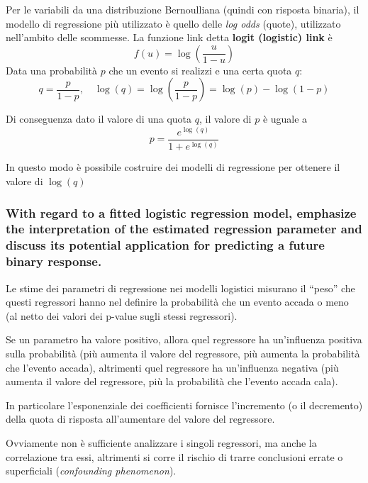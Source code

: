 \documentclass[
]{article}
\begin{document}
Per le variabili da una distribuzione Bernoulliana (quindi con risposta
binaria), il modello di regressione più utilizzato è quello delle
\emph{log odds} (quote), utilizzato nell'ambito delle scommesse. La
funzione link detta \textbf{logit (logistic) link} è
\[ f(u) = \log \left( \frac{u}{1-u}\right) \] Data una probabilità \(p\)
che un evento si realizzi e una certa quota \(q\):
\[q = \frac{p}{1-p}, \quad \log(q) = \log \left( \frac{p}{1-p}\right) = \log(p) - \log(1-p)\]

Di conseguenza dato il valore di una quota \(q\), il valore di \(p\) è
uguale a \[ p = \frac{e^{\log(q)}}{1+e^{\log(q)}} \]

In questo modo è possibile costruire dei modelli di regressione per
ottenere il valore di \(\log(q)\)

\hypertarget{with-regard-to-a-fitted-logistic-regression-model-emphasize-the-interpretation-of-the-estimated-regression-parameter-and-discuss-its-potential-application-for-predicting-a-future-binary-response.}{%
\subsubsection{With regard to a fitted logistic regression model,
emphasize the interpretation of the estimated regression parameter and
discuss its potential application for predicting a future binary
response.}\label{with-regard-to-a-fitted-logistic-regression-model-emphasize-the-interpretation-of-the-estimated-regression-parameter-and-discuss-its-potential-application-for-predicting-a-future-binary-response.}}

Le stime dei parametri di regressione nei modelli logistici misurano il
``peso'' che questi regressori hanno nel definire la probabilità che un
evento accada o meno (al netto dei valori dei p-value sugli stessi
regressori).

Se un parametro ha valore positivo, allora quel regressore ha
un'influenza positiva sulla probabilità (più aumenta il valore del
regressore, più aumenta la probabilità che l'evento accada), altrimenti
quel regressore ha un'influenza negativa (più aumenta il valore del
regressore, più la probabilità che l'evento accada cala).

In particolare l'esponenziale dei coefficienti fornisce l'incremento (o
il decremento) della quota di risposta all'aumentare del valore del
regressore.

Ovviamente non è sufficiente analizzare i singoli regressori, ma anche
la correlazione tra essi, altrimenti si corre il rischio di trarre
conclusioni errate o superficiali (\emph{confounding phenomenon}).
\end{document}
